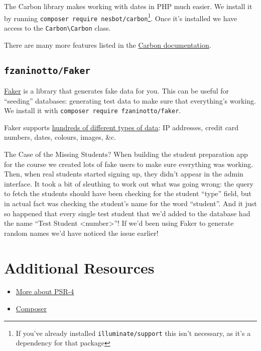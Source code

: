 The Carbon library makes working with dates in PHP much easier. We install it by running \texttt{composer require nesbot/carbon}\footnote{If you've already installed \texttt{illuminate/support} this isn't necessary, as it's a dependency for that package}. Once it's installed we have access to the \texttt{Carbon\textbackslash Carbon} class.


There are many more features listed in the \href{https://carbon.nesbot.com/docs/}{Carbon documentation}.


\subsection{\texttt{fzaninotto/Faker}}

\href{https://github.com/fzaninotto/Faker}{Faker} is a library that generates fake data for you. This can be useful for ``seeding'' databases: generating test data to make sure that everything's working. We install it with \texttt{composer require fzaninotto/faker}.


Faker supports \href{https://github.com/fzaninotto/Faker#formatters}{hundreds of different types of data}: IP addresses, credit card numbers, dates, colours, images, \&c.


\begin{infobox}{The Case of the Missing Students?}
    When building the student preparation app for the course we created lots of fake users to make sure everything was working. Then, when real students started signing up, they didn't appear in the admin interface. It took a bit of sleuthing to work out what was going wrong: the query to fetch the students should have been checking for the student ``type'' field, but in actual fact was checking the student's name for the word ``student''. And it just so happened that every single test student that we'd added to the database had the name ``Test Student <number>''! If we'd been using Faker to generate random names we'd have noticed the issue earlier!
\end{infobox}

\section{Additional Resources}

\begin{itemize}[leftmargin=*]
    \item \href{https://www.php-fig.org/psr/psr-4/meta/}{More about PSR-4}
    \item \href{https://getcomposer.org}{Composer}
\end{itemize}
